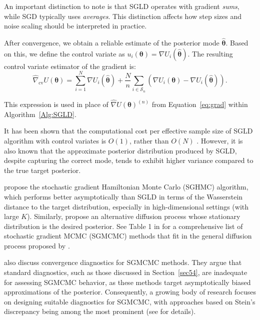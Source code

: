 An important distinction to note is that SGLD operates with gradient \emph{sums}, while SGD typically uses \emph{averages}. This distinction affects how step sizes and noise scaling should be interpreted in practice.

After convergence, we obtain a reliable estimate of the posterior mode \( \hat{\boldsymbol{\theta}} \). Based on this, we define the control variate as \( u_i(\boldsymbol{\theta}) = \nabla U_i(\hat{\boldsymbol{\theta}}) \). The resulting control variate estimator of the gradient is:
\[
\hat{\nabla}_{\text{cv}} U(\boldsymbol{\theta}) = \sum_{i=1}^N \nabla U_i(\hat{\boldsymbol{\theta}}) + \frac{N}{n} \sum_{i \in \mathcal{S}_n} \left( \nabla U_i(\boldsymbol{\theta}) - \nabla U_i(\hat{\boldsymbol{\theta}}) \right).
\]

This expression is used in place of \( \hat{\nabla} U(\boldsymbol{\theta})^{(n)} \) from Equation~\ref{eq:grad} within Algorithm~\ref{Alg:SGLD}.

It has been shown that the computational cost per effective sample size of SGLD algorithm with control variates is \( O(1) \), rather than \( O(N) \) \cite{nemeth2021stochastic}. However, it is also known that the approximate posterior distribution produced by SGLD, despite capturing the correct mode, tends to exhibit higher variance compared to the true target posterior.

\cite{chen2014stochastic} propose the stochastic gradient Hamiltonian Monte Carlo (SGHMC) algorithm, which performs better asymptotically than SGLD in terms of the Wasserstein distance to the target distribution, especially in high-dimensional settings (with large \( K \)). Similarly, \cite{ma2015complete} propose an alternative diffusion process whose stationary distribution is the desired posterior. See Table 1 in \cite{nemeth2021stochastic} for a comprehensive list of stochastic gradient MCMC (SGMCMC) methods that fit in the general diffusion process proposed by \cite{ma2015complete}.

\cite{nemeth2021stochastic} also discuss convergence diagnostics for SGMCMC methods. They argue that standard diagnostics, such as those discussed in Section~\ref{sec54}, are inadequate for assessing SGMCMC behavior, as these methods target asymptotically biased approximations of the posterior. Consequently, a growing body of research focuses on designing suitable diagnostics for SGMCMC, with approaches based on Stein's discrepancy being among the most prominent (see \cite{nemeth2021stochastic} for details).

